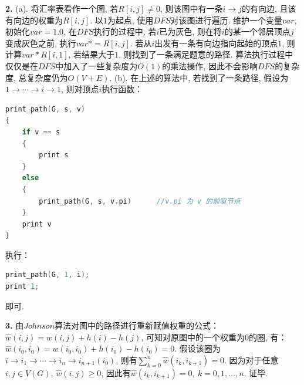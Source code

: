 \documentclass{article}
\begin{document}
	\begin{solution}\textnormal{\textbf{2.}}
		(a). 将汇率表看作一个图, 若$R[i, j] \neq 0$, 则该图中有一条$i \to j$的有向边, 且该有向边的权重为$R[i, j]$. 以$1$为起点,
		使用$DFS$对该图进行遍历.\newline
		维护一个变量$var$, 初始化$var = 1.0$, 在$DFS$执行的过程中, 若$i$已为灰色, 则在将$i$的某一个邻居顶点$j$变成灰色之前, 执行$var *= R[i, j]$.
		若从$i$出发有一条有向边指向起始的顶点$1$, 则计算$var * R[i, 1]$, 若结果大于$1$, 则找到了一条满足题意的路径.\newline
		算法执行过程中仅仅是在$DFS$中加入了一些复杂度为$O(1)$的乘法操作, 因此不会影响$DFS$的复杂度, 总复杂度仍为$O(V + E)$.\newline
		(b). 在上述的算法中, 若找到了一条路径, 假设为$1 \to \cdots \to i \to 1$, 则对顶点$i$执行函数：\newline
		{\rm
		\begin{lstlisting}[language=C]
print_path(G, s, v)
{
	if v == s
	{
		print s
	}
	else
	{
		print_path(G, s, v.pi)		//v.pi 为 v 的前驱节点
	}
	print v
}
		\end{lstlisting}
		}
		执行：
		{\rm
		\begin{lstlisting}[language=C]
print_path(G, 1, i);
print 1;
		\end{lstlisting}
		}
		即可.
	\end{solution}
	\begin{solution}\textnormal{\textbf{3.}}
		由$Johnson$算法对图中的路径进行重新赋值权重的公式：$\hat{w}(i, j) = w(i, j) + h(i) - h(j)$, 可知对原图中的一个权重为$0$的圈, 有：\newline
		$\hat{w}(i_0, i_0) = w(i_0, i_0) + h(i_0) - h(i_0) = 0$. 假设该圈为$i \to i_1 \to \cdots \to i_n \to i_{n + 1}(i_0)$, 则有$\displaystyle\sum_{k = 0}^{n}\hat{w}(i_k, i_{k + 1}) = 0$.\newline
		因为对于任意$i, j \in V(G)$, $\hat{w}(i, j) \geq 0$, 因此有$\hat{w}(i_k, i_{k + 1}) = 0,\ k = 0, 1, \dots ,n$. 证毕.
	\end{solution}
\end{document}
